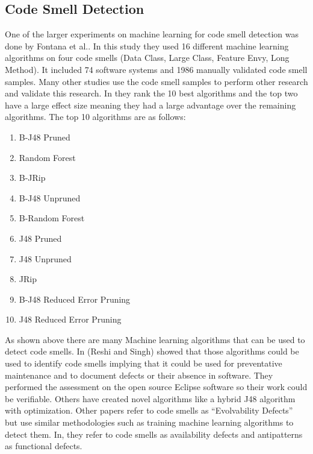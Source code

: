 \documentclass[conference]{IEEEtran}
\begin{document}
\subsection{Code Smell Detection}
One of the larger experiments on machine learning for code smell detection was done by Fontana et al.\cite{arcelli_fontana_comparing_2016}. In this study they used 16 different machine learning algorithms on four code smells (Data Class, Large Class, Feature Envy, Long Method). It included 74 software systems and 1986 manually validated code smell samples. Many other studies use the code smell samples to perform other research and validate this research. 
In\cite{arcelli_fontana_comparing_2016} they rank the 10 best algorithms and the top two have a large effect size meaning they had a large advantage over the remaining algorithms.
The top 10 algorithms are as follows:
\begin{enumerate}
\item B-J48 Pruned
\item Random Forest
\item B-JRip
\item B-J48 Unpruned
\item B-Random Forest
\item J48 Pruned
\item J48 Unpruned
\item JRip
\item B-J48 Reduced Error Pruning
\item J48 Reduced Error Pruning
\end{enumerate}

As shown above there are many Machine learning algorithms that can be used to detect code smells\cite{reshi_investigating_2019}\cite{karaduzovic-hadziabdic_comparison_2018}\cite{reshi_predicting_2018}\cite{nucci_detecting_2018}\cite{karaduzovic-hadziabdic_comparison_2018}\cite{kaur_support_2017}\cite{hozano_evaluating_2017}\cite{le_architectural-based_2016}. In\cite{reshi_investigating_2019}\cite{reshi_predicting_2018} (Reshi and Singh) showed that those algorithms could be used to identify code smells implying that it could be used for preventative maintenance and to document defects or their absence in software. 
They performed the assessment on the open source Eclipse software so their work could be verifiable. Others have created novel algorithms\cite{kaur_sp-j48:_2019} like a hybrid J48 algorithm with optimization.
Other papers refer to code smells as ``Evolvability Defects''\cite{tsuda_machine_2018} but use similar methodologies such as training machine learning algorithms to detect them. In\cite{tsuda_machine_2018}, they refer to code smells as availability defects and antipatterns as functional defects.
\end{document}
